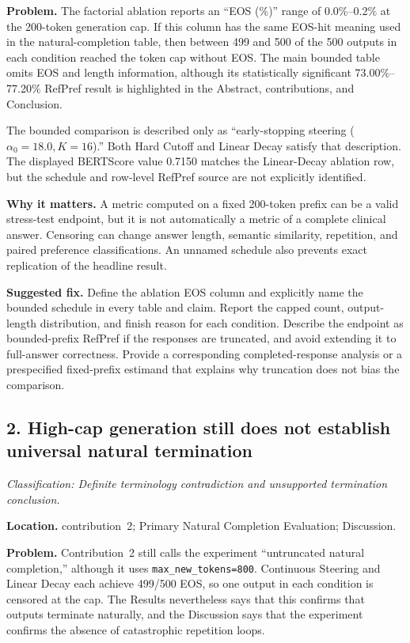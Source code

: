 \documentclass[11pt]{article}
\newcommand{\findinglabel}[1]{\textbf{#1}}
\newcommand{\classification}[1]{\textit{Classification: #1.}}
\begin{document}
\findinglabel{Problem.} The factorial ablation reports an ``EOS (\%)'' range of 0.0\%--0.2\% at the 200-token generation cap.  If this column has the same EOS-hit meaning used in the natural-completion table, then between 499 and 500 of the 500 outputs in each condition reached the token cap without EOS.  The main bounded table omits EOS and length information, although its statistically significant 73.00\%--77.20\% RefPref result is highlighted in the Abstract, contributions, and Conclusion.

The bounded comparison is described only as ``early-stopping steering ($\alpha_0=18.0,K=16$).''  Both Hard Cutoff and Linear Decay satisfy that description.  The displayed BERTScore value 0.7150 matches the Linear-Decay ablation row, but the schedule and row-level RefPref source are not explicitly identified.

\findinglabel{Why it matters.} A metric computed on a fixed 200-token prefix can be a valid stress-test endpoint, but it is not automatically a metric of a complete clinical answer.  Censoring can change answer length, semantic similarity, repetition, and paired preference classifications.  An unnamed schedule also prevents exact replication of the headline result.

\findinglabel{Suggested fix.} Define the ablation EOS column and explicitly name the bounded schedule in every table and claim.  Report the capped count, output-length distribution, and finish reason for each condition.  Describe the endpoint as bounded-prefix RefPref if the responses are truncated, and avoid extending it to full-answer correctness.  Provide a corresponding completed-response analysis or a prespecified fixed-prefix estimand that explains why truncation does not bias the comparison.

\subsection*{2. High-cap generation still does not establish universal natural termination}

\classification{Definite terminology contradiction and unsupported termination conclusion}

\findinglabel{Location.} contribution~2; Primary Natural Completion Evaluation; Discussion.

\findinglabel{Problem.} Contribution~2 still calls the experiment ``untruncated natural completion,'' although it uses \texttt{max\_new\_tokens=800}.  Continuous Steering and Linear Decay each achieve 499/500 EOS, so one output in each condition is censored at the cap.  The Results nevertheless says that this confirms that outputs terminate naturally, and the Discussion says that the experiment confirms the absence of catastrophic repetition loops.
\end{document}
